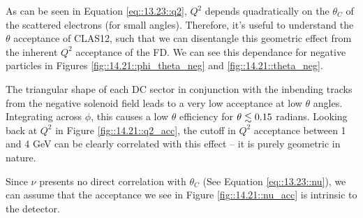     As can be seen in Equation \eqref{eq::13.23::q2}, $Q^2$ depends quadratically on the $\theta_C$ of the scattered electrons (for small angles).
    Therefore, it's useful to understand the $\theta$ acceptance of CLAS12, such that we can disentangle this geometric effect from the inherent $Q^2$ acceptance of the FD.
    We can see this dependance for negative particles in Figures \ref{fig::14.21::phi_theta_neg} and \ref{fig::14.21::theta_neg}.

    The triangular shape of each DC sector in conjunction with the inbending tracks from the negative solenoid field leads to a very low acceptance at low $\theta$ angles.
    Integrating across $\phi$, this causes a low $\theta$ efficiency for $\theta \lesssim 0.15$ radians.
    Looking back at $Q^2$ in Figure \ref{fig::14.21::q2_acc}, the cutoff in $Q^2$ acceptance between 1 and 4 GeV can be clearly correlated with this effect -- it is purely geometric in nature.

    Since $\nu$ presents no direct correlation with $\theta_C$ (See Equation \eqref{eq::13.23::nu}), we can assume that the acceptance we see in Figure \ref{fig::14.21::nu_acc} is intrinsic to the detector.
